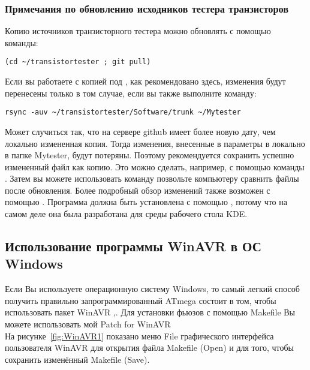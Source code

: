 \subsubsection{Примечания по обновлению исходников тестера транзисторов}
Копию источников транзисторного тестера можно обновлять с помощью команды:
\begin{large} \vspace{-0.4em} \begin{verbatim}
(cd ~/transistortester ; git pull)
\end{verbatim} \end{large}
Если вы работаете с копией под , как рекомендовано здесь,
изменения будут перенесены только в том случае, если вы также выполните команду:
\begin{large} \vspace{-0.4em} \begin{verbatim}
rsync -auv ~/transistortester/Software/trunk ~/Mytester
\end{verbatim} \end{large}
Может случиться так, что  на сервере github имеет более новую дату, чем локально измененная копия.
Тогда изменения, внесенные в параметры в  локально в папке Mytester, будут потеряны.
Поэтому рекомендуется сохранить успешно измененный файл  как копию.
Это можно сделать, например, с помощью команды .
Затем вы можете использовать команду 
позвольте компьютеру сравнить файлы после обновления.
Более подробный обзор изменений также возможен с помощью .
Программа должна быть установлена с помощью ,
потому что на самом деле она была разработана для среды рабочего стола KDE.

\newpage

\subsection{Использование программы WinAVR в ОС Windows}
Если Вы используете операционную систему Windows, то самый легкий способ получить правильно запрограммированный ATmega 
состоит в том, чтобы использовать пакет WinAVR \cite{winavr1},\cite{winavr2}.
Для установки фьюзов с помощью Makefile Вы можете использовать мой Patch for WinAVR  \cite{winavr3}\\

На рисунке~\ref{fig:WinAVR1} показано меню File графического интерфейса пользователя WinAVR для открытия файла 
Makefile (Open) и для того, чтобы сохранить изменённый Makefile (Save).

